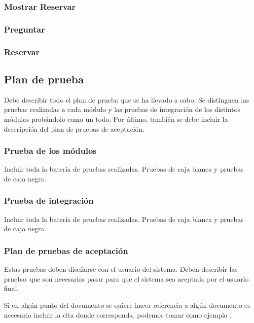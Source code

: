 \bigskip
%

\subsubsection{Mostrar Reservar}

\bigskip
%

\subsubsection{Preguntar}

\bigskip
%

\subsubsection{Reservar}

\bigskip
%

\subsection{Plan de prueba}

Debe describir todo el plan de prueba que se ha llevado a cabo. Se distinguen las pruebas realizadas a cada módulo y las pruebas de integración de los distintos módulos probándolo como un todo. Por último, también se debe incluir la descripción del plan de pruebas de aceptación.  


\subsubsection{Prueba de los módulos}

Incluir toda la batería de pruebas realizadas. Pruebas de caja blanca y pruebas de caja negra.  


\subsubsection{Prueba de integración}

Incluir toda la batería de pruebas realizadas. Pruebas de caja blanca y pruebas de caja negra.  


\subsubsection{ Plan de pruebas de aceptación}

Estas pruebas deben diseñarse con el usuario del sistema. Deben describir las pruebas que son necesarias pasar para que el sistema sea aceptado por el usuario final.  

\bigskip

Si en algún punto del documento se quiere hacer referencia a algún documento es necesario incluir la cita donde corresponda, podemos tomar como ejemplo \cite{Ejemplo3}. 